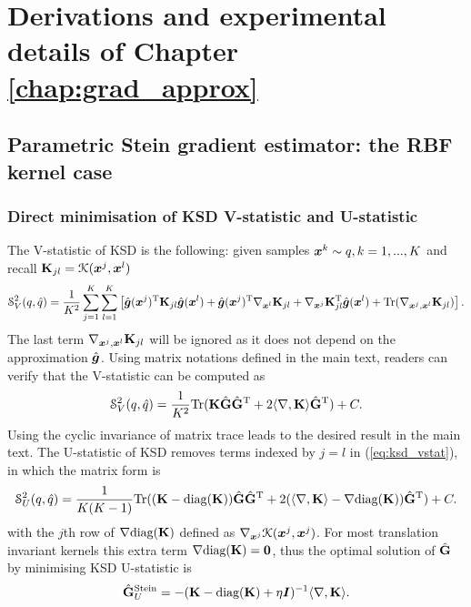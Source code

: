 \section{Derivations and experimental details of Chapter \ref{chap:grad_approx}}
\label{sec:appendix_stein}

\subsection{Parametric Stein gradient estimator: the RBF kernel case}

\subsubsection{Direct minimisation of KSD V-statistic and U-statistic}
The V-statistic of KSD is the following: given samples $\bm{x}^k \sim q, k = 1, ..., K$ and recall $\mathbf{K}_{jl} = \mathcal{K}(\bm{x}^j, \bm{x}^l)$
\begin{equation}
\mathcal{S}_V^2(q, \hat{q}) = \frac{1}{K^2} \sum_{j=1}^K \sum_{l=1}^K \left[ \hat{\bm{g}}(\bm{x}^j)^{\text{T}} \mathbf{K}_{jl} \hat{\bm{g}}(\bm{x}^l) + \hat{\bm{g}}(\bm{x}^j)^{\text{T}} \nabla_{\bm{x}^l} \mathbf{K}_{jl} + \nabla_{\bm{x}^j} \mathbf{K}_{jl}^{\text{T}} \hat{\bm{g}}(\bm{x}^l) + \text{Tr}(\nabla_{\bm{x}^j, \bm{x}^l} \mathbf{K}_{jl} )\right].
\label{eq:ksd_vstat}
\end{equation}
The last term $\nabla_{\bm{x}^j, \bm{x}^l} \mathbf{K}_{jl}$ will be ignored as it does not depend on the approximation $\hat{\bm{g}}$. Using matrix notations defined in the main text, readers can verify that the V-statistic can be computed as
\begin{equation}
\mathcal{S}_{V}^2(q, \hat{q}) = \frac{1}{K^2} \text{Tr} (\mathbf{K} \hat{\mathbf{G}} \hat{\mathbf{G}}^{\text{T}} + 2 \langle \nabla, \mathbf{K} \rangle \hat{\mathbf{G}}^{\text{T}} ) + C.
\end{equation}
Using the cyclic invariance of matrix trace leads to the desired result in the main text. 
The U-statistic of KSD removes terms indexed by $j = l$ in (\ref{eq:ksd_vstat}), in which the matrix form is
\begin{equation}
\mathcal{S}_{U}^2(q, \hat{q}) = \frac{1}{K(K-1)} \text{Tr} ( (\mathbf{K} - \text{diag}(\mathbf{K})) \hat{\mathbf{G}} \hat{\mathbf{G}}^{\text{T}} + 2 (\langle \nabla, \mathbf{K} \rangle - \nabla \text{diag}(\mathbf{K}) ) \hat{\mathbf{G}}^{\text{T}} ) + C.
\end{equation}
with the $j$th row of $\nabla \text{diag}(\mathbf{K})$ defined as $\nabla_{\bm{x}^j} \mathcal{K}(\bm{x}^j, \bm{x}^j)$. For most translation invariant kernels this extra term $\nabla \text{diag}(\mathbf{K}) = \bm{0}$, thus the optimal solution of $\hat{\mathbf{G}}$ by minimising KSD U-statistic is 
\begin{equation}
\hat{\mathbf{G}}_U^{\text{Stein}} = -( \mathbf{K} - \text{diag}(\mathbf{K}) + \eta \bm{I} )^{-1} \langle \nabla, \mathbf{K} \rangle.
\end{equation}

